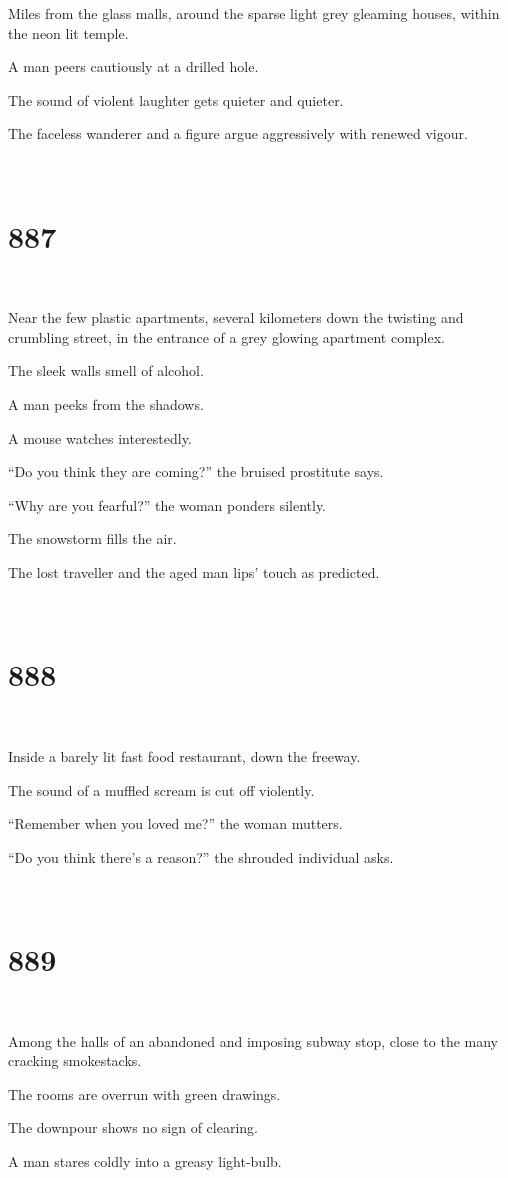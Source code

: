 \documentclass{report}
\begin{document}
Miles from the glass malls, around the sparse light grey gleaming houses, within the neon lit temple.

A man peers cautiously at a drilled hole.

The sound of violent laughter gets quieter and quieter.

The faceless wanderer and a figure argue aggressively with renewed vigour.

~
\chapter*{887}
~

Near the few plastic apartments, several kilometers down the twisting and crumbling street, in the entrance of a grey glowing apartment complex.

The sleek walls smell of alcohol.

A man peeks from the shadows.

A mouse watches interestedly.

``Do you think they are coming?'' the bruised prostitute says.

``Why are you fearful?'' the woman ponders silently.

The snowstorm fills the air.

The lost traveller and the aged man lips' touch as predicted.

~
\chapter*{888}
~

Inside a barely lit fast food restaurant, down the freeway.

The sound of a muffled scream is cut off violently.

``Remember when you loved me?'' the woman mutters.

``Do you think there's a reason?'' the shrouded individual asks.

~
\chapter*{889}
~

Among the halls of an abandoned and imposing subway stop, close to the many cracking smokestacks.

The rooms are overrun with green drawings.

The downpour shows no sign of clearing.

A man stares coldly into a greasy light-bulb.
\end{document}
